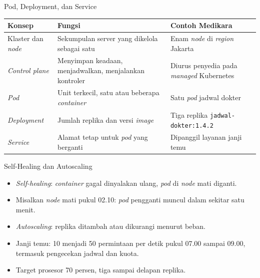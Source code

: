 \documentclass[aspectratio=169, table, 12pt]{beamer}
\begin{document}
\begin{frame}{{\Large Pod, Deployment, dan Service}}
  \footnotesize
  \begin{tabularx}{\textwidth}{>{\raggedright\arraybackslash}p{2.6cm}
      >{\raggedright\arraybackslash}X >{\raggedright\arraybackslash}X}
    \hline
    \textbf{Konsep} & \textbf{Fungsi} & \textbf{Contoh Medikara} \\
    \hline
    Klaster dan \textit{node} & Sekumpulan server yang dikelola sebagai satu &
      Enam \textit{node} di \textit{region} Jakarta \\
    \hline
    \textit{Control plane} & Menyimpan keadaan, menjadwalkan, menjalankan
      kontroler & Diurus penyedia pada \textit{managed} Kubernetes \\
    \hline
    \textit{Pod} & Unit terkecil, satu atau beberapa \textit{container} & Satu
      \textit{pod} jadwal dokter \\
    \hline
    \textit{Deployment} & Jumlah replika dan versi \textit{image} & Tiga replika
      \texttt{jadwal-dokter:1.4.2} \\
    \hline
    \textit{Service} & Alamat tetap untuk \textit{pod} yang berganti &
      Dipanggil layanan janji temu \\
    \hline
  \end{tabularx}
\end{frame}

\begin{frame}{{\Large Self-Healing dan Autoscaling}}
  \vspace{6pt}
  \begin{itemize}
    \item \textit{Self-healing}: \textit{container} gagal dinyalakan ulang,
          \textit{pod} di \textit{node} mati diganti.
    \item Misalkan \textit{node} mati pukul 02.10: \textit{pod} pengganti
          muncul dalam sekitar satu menit.
    \item \textit{Autoscaling}: replika ditambah atau dikurangi menurut beban.
    \item Janji temu: 10 menjadi 50 permintaan per detik pukul 07.00 sampai
          09.00, termasuk pengecekan jadwal dan kuota.
    \item Target prosesor 70 persen, tiga sampai delapan replika.
  \end{itemize}
\end{frame}
\end{document}
